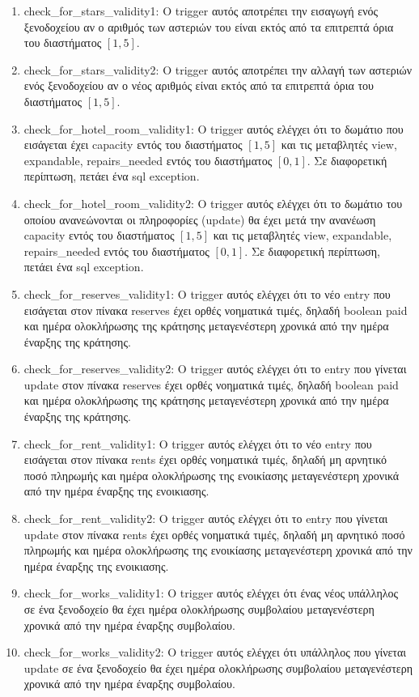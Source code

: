 \documentclass[a4paper,oneside, 11pt]{article}
\begin{document}
\begin{enumerate}
\item check\_for\_stars\_validity1: Ο trigger αυτός αποτρέπει την εισαγωγή ενός ξενοδοχείου αν ο αριθμός των αστεριών του είναι εκτός από τα επιτρεπτά όρια του διαστήματος $[1,5]$.

\item check\_for\_stars\_validity2: Ο trigger αυτός αποτρέπει την αλλαγή των αστεριών ενός ξενοδοχείου αν ο νέος αριθμός είναι εκτός από τα επιτρεπτά όρια του διαστήματος $[1,5]$.

\item check\_for\_hotel\_room\_validity1: Ο trigger αυτός ελέγχει ότι το δωμάτιο που εισάγεται έχει capacity εντός του διαστήματος $[1,5]$ και τις μεταβλητές view, expandable, repairs\_needed εντός του διαστήματος $[0,1]$. Σε διαφορετική περίπτωση, πετάει ένα sql exception.


\item check\_for\_hotel\_room\_validity2: Ο trigger αυτός ελέγχει ότι το δωμάτιο του οποίου ανανεώνονται οι πληροφορίες (update) θα έχει μετά την ανανέωση capacity εντός του διαστήματος $[1,5]$ και τις μεταβλητές view, expandable, repairs\_needed εντός του διαστήματος $[0,1]$. Σε διαφορετική περίπτωση, πετάει ένα sql exception.

\item check\_for\_reserves\_validity1: Ο trigger αυτός ελέγχει ότι το νέο entry που εισάγεται στον πίνακα reserves έχει ορθές νοηματικά τιμές, δηλαδή boolean paid και ημέρα ολοκλήρωσης της κράτησης μεταγενέστερη χρονικά από την ημέρα έναρξης της κράτησης.



\item check\_for\_reserves\_validity2: Ο trigger αυτός ελέγχει ότι το entry που γίνεται update στον πίνακα reserves έχει ορθές νοηματικά τιμές, δηλαδή boolean paid και ημέρα ολοκλήρωσης της κράτησης μεταγενέστερη χρονικά από την ημέρα έναρξης της κράτησης.

\item check\_for\_rent\_validity1: Ο trigger αυτός ελέγχει ότι το νέο entry που εισάγεται στον πίνακα rents έχει ορθές νοηματικά τιμές, δηλαδή μη αρνητικό ποσό πληρωμής και ημέρα ολοκλήρωσης της ενοικίασης μεταγενέστερη χρονικά από την ημέρα έναρξης της ενοικιασης.


\item check\_for\_rent\_validity2: Ο trigger αυτός ελέγχει ότι το entry που γίνεται update στον πίνακα rents έχει ορθές νοηματικά τιμές, δηλαδή μη αρνητικό ποσό πληρωμής και ημέρα ολοκλήρωσης της ενοικίασης μεταγενέστερη χρονικά από την ημέρα έναρξης της ενοικιασης.


\item check\_for\_works\_validity1: Ο trigger αυτός ελέγχει ότι ένας νέος υπάλληλος σε ένα ξενοδοχείο θα έχει ημέρα ολοκλήρωσης συμβολαίου μεταγενέστερη χρονικά από την ημέρα έναρξης συμβολαίου.

\item check\_for\_works\_validity2: Ο trigger αυτός ελέγχει ότι υπάλληλος που γίνεται update σε ένα ξενοδοχείο θα έχει ημέρα ολοκλήρωσης συμβολαίου μεταγενέστερη χρονικά από την ημέρα έναρξης συμβολαίου.


\end{enumerate}
\end{document}
